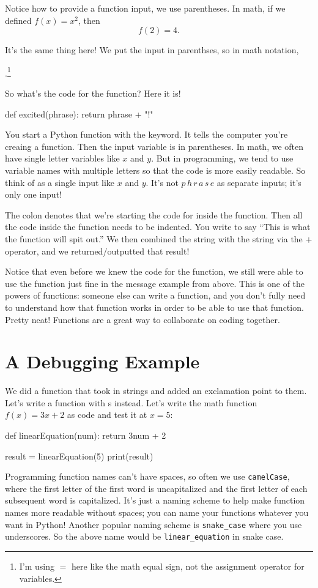 \documentclass[12pt]{scrartcl}
\begin{document}
Notice how to provide a function input, we use parentheses. In math, if we defined $f(x) = x^2$, then
\vspace{1em}
\[f(2) = 4.\]

It's the same thing here! We put the input in parenthses, so in math notation,
\begin{center}
    .\footnote{I'm using $=$ here like the math equal sign, not the assignment operator for variables.}
\end{center}
So what's the code for the  function? Here it is!
\begin{python}
    def excited(phrase):
        return phrase + "!"
\end{python}
You start a Python function with the  keyword. It tells the computer you're creaing a function. Then the input variable is in parentheses. In math, we often have single letter variables like $x$ and $y.$ But in programming, we tend to use variable names with multiple letters so that the code is more easily readable. So think of  as a single input like $x$ and $y$. It's not $p \, h \, r \, a \, s \, e$ as separate inputs; it's only one input!

The colon denotes that we're starting the code for inside the function. Then all the code inside the function needs to be indented. You write  to say ``This is what the function will spit out.'' We then combined the string  with the string  via the $+$ operator, and we returned/outputted that result!\footnotemark

Notice that even before we knew the code for the  function, we still were able to use the function just fine in the message example from above. This is one of the powers of functions: someone else can write a function, and you don't fully need to understand how that function works in order to be able to use that function. Pretty neat! Functions are a great way to collaborate on coding together.

\newpage
\section*{A Debugging Example}
We did a function that took in strings and added an exclamation point to them. Let's write a function with s instead. Let's write the math function $f(x) = 3x + 2$ as code and test it at $x = 5$:
\begin{python}
    def linearEquation(num):
        return 3num + 2

    result = linearEquation(5)
    print(result)
\end{python}
Programming function names can't have spaces, so often we use \texttt{camelCase}, where the first letter of the first word is uncapitalized and the first letter of each subsequent word is capitalized. It's just a naming scheme to help make function names more readable without spaces; you can name your functions whatever you want in Python! Another popular naming scheme is \texttt{snake\_case} where you use underscores.  So the above name would be \texttt{linear\_equation} in snake case.
\end{document}

